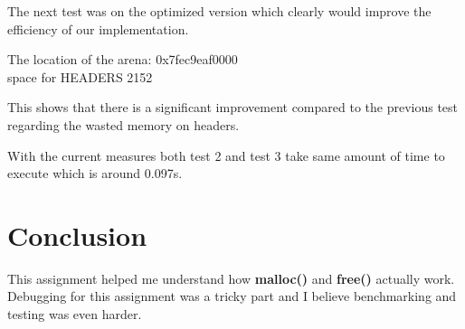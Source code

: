 \documentclass[a4paper,10pt]{article}
\begin{document}
The next test was on the optimized version which clearly would improve the efficiency of our implementation.

\vspace{5mm}
The location of the arena: 0x7fec9eaf0000\\

space for HEADERS 2152\\
\vspace{5mm}

This shows that there is a significant improvement compared to the previous test regarding the wasted memory on headers.

With the current measures both test 2 and test 3 take same amount of time to execute which is around 0.097s.

\section*{Conclusion}
This assignment helped me understand how \textbf{malloc()} and \textbf{free()} actually work. Debugging for this assignment was a tricky part and I believe benchmarking and testing was even harder.
\end{document}
